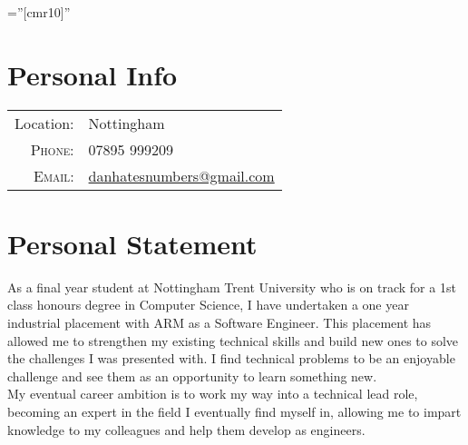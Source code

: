 \documentclass[a4paper,10pt]{article} %
\begin{document}
\pagestyle{empty} %

\font\fb=''[cmr10]'' %


\par{\bigskip\par} %

\section{Personal Info}

\begin{tabular}{rl}
Location: & Nottingham \\
\textsc{Phone:} & 07895 999209\\
\textsc{Email:} & \href{mailto:danhatesnumbers@gmail.com}{danhatesnumbers@gmail.com}
\end{tabular}


\section{Personal Statement}
As a final year student at Nottingham Trent University who is on track for a 1st class honours degree
in Computer Science, I have undertaken a one year industrial placement with ARM as a Software
Engineer. This placement has allowed me to strengthen my existing technical skills and build new
ones to solve the challenges I was presented with. I find technical problems to be an enjoyable
challenge and see them as an opportunity to learn something new. \\
My eventual career ambition is to work my way into a technical lead role, becoming an expert in the
field I eventually find myself in, allowing me to impart knowledge to my colleagues and help them
develop as engineers.

\end{document}
